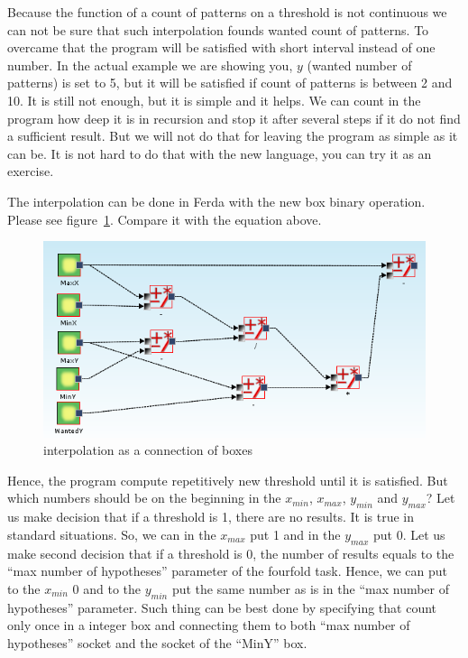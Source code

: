 \documentclass[a4paper,12pt]{book}
\begin{document}
Because the function of a count of patterns on a threshold is not continuous we can not be sure that such interpolation founds wanted count of patterns. To overcame that the program will be satisfied with short interval instead of one number. In the actual example we are showing you, $y$ (wanted number of patterns) is set to 5, but it will be satisfied if count of patterns is between 2 and 10. It is still not enough, but it is simple and it helps. We can count in the program how deep it is in recursion and stop it after several steps if it do not find a sufficient result. But we will not do that for leaving the program as simple as it can be. It is not hard to do that with the new language, you can try it as an exercise. 

The interpolation can be done in Ferda with the new box binary operation. Please see figure~\ref{fig:linearInterpolationBoxes}. Compare it with the equation above.

\begin{figure}
	\includegraphics[width=1\textwidth]{linearInterpolation}
	\caption{interpolation as a connection of boxes}
	\label{fig:linearInterpolationBoxes}
\end{figure}

Hence, the program compute repetitively new threshold until it is satisfied. But which numbers should be on the beginning in the $x_{min}$, $x_{max}$, $y_{min}$ and $y_{max}$? Let us make decision that if a threshold is 1, there are no results. It is true in standard situations. So, we can in the $x_{max}$ put 1 and in the $y_{max}$ put 0. Let us make second decision that if a threshold is 0, the number of results equals to the ``max number of hypotheses'' parameter of the fourfold task. Hence, we can put to the $x_{min}$ 0 and to the $y_{min}$ put the same number as is in the ``max number of hypotheses'' parameter. Such thing can be best done by specifying that count only once in a integer box and connecting them to both ``max number of hypotheses'' socket and the socket of the ``MinY'' box.
\end{document}
